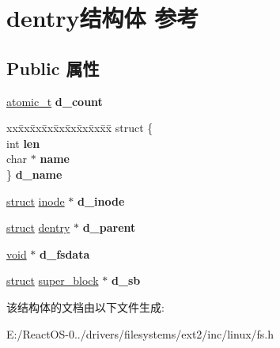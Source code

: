 \hypertarget{structdentry}{}\section{dentry结构体 参考}
\label{structdentry}
\subsection*{Public 属性}
\begin{DoxyCompactItemize}
\item 
\mbox{\label{structdentry_a6a96e9d13346ab0d056307be2b0e0352}} 
\hyperlink{structatomic__t}{atomic\+\_\+t} {\bfseries d\+\_\+count}
\item 
\mbox{\label{structdentry_a5aaa05cbc837282566adfc6182a2dffc}} 
\begin{tabbing}
xx\=xx\=xx\=xx\=xx\=xx\=xx\=xx\=xx\=\kill
struct \{\\
\>int {\bfseries len}\\
\>char $\ast$ {\bfseries name}\\
\} {\bfseries d\_name}\\

\end{tabbing}\item 
\mbox{\label{structdentry_a517538c2ca34b95014556dfad2871697}} 
\hyperlink{interfacestruct}{struct} \hyperlink{structinode}{inode} $\ast$ {\bfseries d\+\_\+inode}
\item 
\mbox{\label{structdentry_a876c1dd6ae73dd90b5fb81f11ed0cf8d}} 
\hyperlink{interfacestruct}{struct} \hyperlink{structdentry}{dentry} $\ast$ {\bfseries d\+\_\+parent}
\item 
\mbox{\label{structdentry_abdbac41f199bb6d3aac67ba405bfca3c}} 
\hyperlink{interfacevoid}{void} $\ast$ {\bfseries d\+\_\+fsdata}
\item 
\mbox{\label{structdentry_a6ca1879b0030933da3dd372d0030589a}} 
\hyperlink{interfacestruct}{struct} \hyperlink{structsuper__block}{super\+\_\+block} $\ast$ {\bfseries d\+\_\+sb}
\end{DoxyCompactItemize}


该结构体的文档由以下文件生成\+:\begin{DoxyCompactItemize}
\item 
E\+:/\+React\+O\+S-\/0../drivers/filesystems/ext2/inc/linux/fs.\+h\end{DoxyCompactItemize}
